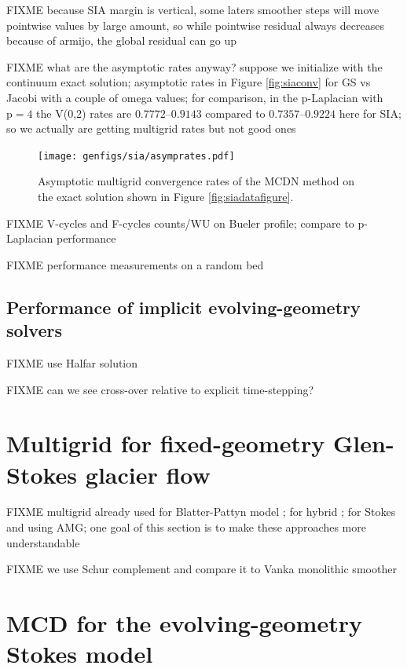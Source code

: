 \documentclass[letterpaper,final,12pt,reqno]{amsart}
\theoremstyle{claim}
\newcommand{\pp}{{\text{p}}}
\numberwithin{equation}{section}
\numberwithin{figure}{section}
\numberwithin{table}{section}
\numberwithin{theorem}{section}
\begin{document}
FIXME because SIA margin is vertical, some laters smoother steps will move pointwise values by large amount, so while pointwise residual always decreases because of armijo, the global residual can go up

FIXME what are the asymptotic rates anyway? suppose we initialize with the continuum exact solution; asymptotic rates in Figure \ref{fig:siaconv} for GS vs Jacobi with a couple of omega values; for comparison, in the $\pp$-Laplacian with $\pp=4$ the V(0,2) rates are $0.7772$--$0.9143$ compared to $0.7357$--$0.9224$ here for SIA; so we actually are getting multigrid rates but not good ones

\begin{figure}
\texttt{[image: genfigs/sia/asymprates.pdf]}
\caption{Asymptotic multigrid convergence rates of the MCDN method on the exact solution shown in Figure \ref{fig:siadatafigure}.}
\label{fig:siaasymp}
\end{figure}

FIXME V-cycles and F-cycles counts/WU on Bueler profile; compare to $\pp$-Laplacian performance

FIXME performance measurements on a random bed

\subsection{Performance of implicit evolving-geometry solvers} \label{subsec:siaimplicit}  FIXME use Halfar solution

FIXME can we see cross-over relative to explicit time-stepping?


\section{Multigrid for fixed-geometry Glen-Stokes glacier flow} \label{sec:stokes}

FIXME multigrid already used for Blatter-Pattyn model \cite{BrownSmithAhmadia2013}; for hybrid \cite{Jouvetetal2013,JouvetGraeser2013}; for Stokes \cite{IsaacStadlerGhattas2015} and \cite{Tuminaroetal2016} using AMG; one goal of this section is to make these approaches more understandable

FIXME we use Schur complement \cite{Bueler2021,Elmanetal2014} and compare it to Vanka monolithic smoother \cite{Farrelletal2019}


\section{MCD for the evolving-geometry Stokes model} \label{sec:evolvingstokes}
\end{document}
